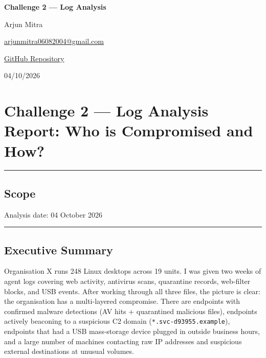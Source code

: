 \documentclass[
]{article}
\author{Arjun Mitra\\\href{mailto:arjunmitra06082004@gmail.com}{arjunmitra06082004@gmail.com}\\\href{https://github.com/TheLearnerAllTime002/Digital-Forensics-Challeng}{GitHub Repository}}
\date{04/10/2026}
\begin{document}
\begin{titlepage}
\centering
\vspace*{2cm}
{\LARGE\bfseries Challenge 2 --- Log Analysis\par}
\vspace{1.5cm}
{\large Arjun Mitra\par}
\vspace{0.3cm}
{\normalsize \href{mailto:arjunmitra06082004@gmail.com}{arjunmitra06082004@gmail.com}\par}
\vspace{0.3cm}
{\normalsize \href{https://github.com/TheLearnerAllTime002/Digital-Forensics-Challeng}{GitHub Repository}\par}
\vfill
{\large 04/10/2026\par}
\end{titlepage}
\tableofcontents
\newpage


\section{Challenge 2 --- Log Analysis Report: Who is Compromised and
How?}\label{challenge-2-log-analysis-report-who-is-compromised-and-how}

\begin{center}\rule{0.5\linewidth}{0.5pt}\end{center}

\subsection{Scope}\label{scope}

Analysis date: 04 October 2026

\begin{center}\rule{0.5\linewidth}{0.5pt}\end{center}

\subsection{Executive Summary}\label{executive-summary}

Organisation X runs 248 Linux desktops across 19 units. I was given two
weeks of agent logs covering web activity, antivirus scans, quarantine
records, web-filter blocks, and USB events. After working through all
three files, the picture is clear: the organisation has a multi-layered
compromise. There are endpoints with confirmed malware detections (AV
hits + quarantined malicious files), endpoints actively beaconing to a
suspicious C2 domain (\texttt{*.svc-d93955.example}), endpoints that had
a USB mass-storage device plugged in outside business hours, and a large
number of machines contacting raw IP addresses and suspicious external
destinations at unusual volumes.
\end{document}
